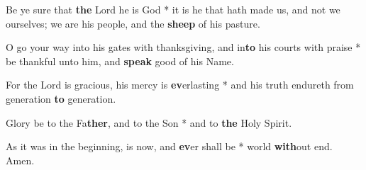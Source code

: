 \begin{multicols}{2}
	Be ye sure that \textbf{the} Lord he is God * it is he that hath made us, and not we ourselves; we are his people, and the \textbf{sheep} of his pasture.
	
	O go your way into his gates with thanksgiving, and in\textbf{to} his courts with praise * be thankful unto him, and \textbf{speak} good of his Name.
	
	For the Lord is gracious, his mercy is \textbf{ev}erlasting * and his truth endureth from generation \textbf{to} generation.
	
	Glory be to the Fa\textbf{ther}, and to the Son * and to \textbf{the} Holy Spirit.
	
	As it was in the beginning, is now, and \textbf{ev}er shall be * world \textbf{with}out end. Amen.
\end{multicols}